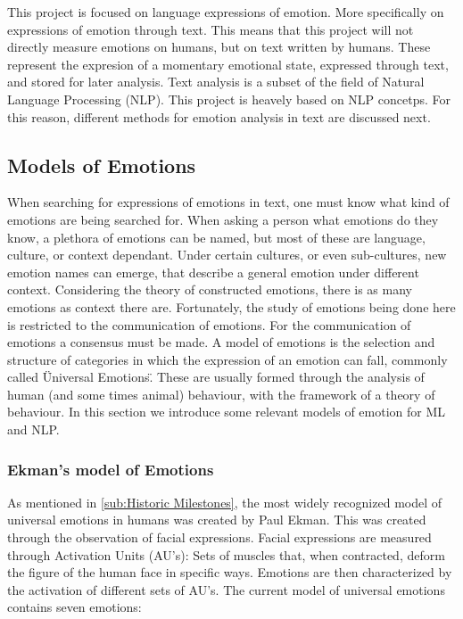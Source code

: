This project is focused on language expressions of emotion. More specifically on expressions of emotion through text. This means that this project will not directly measure emotions on humans, but on text written by humans. These represent the expresion of a momentary emotional state, expressed through text, and stored for later analysis. Text analysis is a subset of the field of Natural Language Processing (NLP). This project is heavely based on NLP concetps. For this reason, different methods for emotion analysis in text are discussed next.

\subsection{Models of Emotions}\label{sub:Models of Emotions}
When searching for expressions of emotions in text, one must know what kind of emotions are being searched for. When asking a person what emotions do they know, a plethora of emotions can be named, but most of these are language, culture, or context dependant. Under certain cultures, or even sub-cultures, new emotion names can emerge, that describe a general emotion under different context. Considering the theory of constructed emotions, there is as many emotions as context there are. Fortunately, the study of emotions being done here is restricted to the communication of emotions. For the communication of emotions a consensus must be made.
A model of emotions is the selection and structure of categories in which the expression of an emotion can fall, commonly called \"Universal Emotions\". These are usually formed through the analysis of human (and some times animal) behaviour, with the framework of a theory of behaviour. In this section we introduce some relevant models of emotion for ML and NLP.

\subsubsection{Ekman's model of Emotions}\label{subs:Ekman's model of Emotions}
As mentioned in \ref{sub:Historic Milestones}, the most widely recognized model of universal emotions in humans was created by Paul Ekman\cite{ekman1992basic}. This was created through the observation of facial expressions. Facial expressions are measured through Activation Units (AU's): Sets of muscles that, when contracted, deform the figure of the human face in specific ways. Emotions are then characterized by the activation of different sets of AU's. The current model of universal emotions contains seven emotions:

